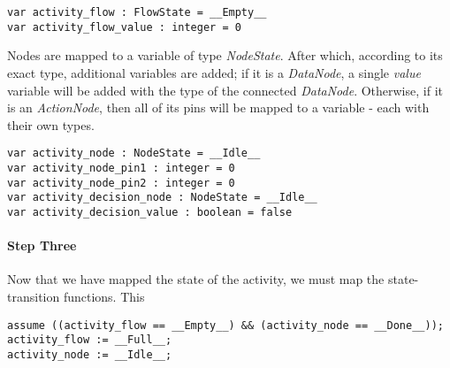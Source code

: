 \begin{lstlisting}[language=xsts]
var activity_flow : FlowState = __Empty__
var activity_flow_value : integer = 0
\end{lstlisting}

Nodes are mapped to a variable of type \emph{NodeState}. After which, according to its exact type, additional variables are added; if it is a \emph{DataNode}, a single \emph{value} variable will be added with the type of the connected \emph{DataNode}. Otherwise, if it is an \emph{ActionNode}, then all of its pins will be mapped to a variable - each with their own types.

\begin{lstlisting}[language=xsts]
var activity_node : NodeState = __Idle__
var activity_node_pin1 : integer = 0
var activity_node_pin2 : integer = 0
var activity_decision_node : NodeState = __Idle__
var activity_decision_value : boolean = false
\end{lstlisting}

\paragraph{Step Three} 

Now that we have mapped the state of the activity, we must map the state-transition functions. This 

\begin{lstlisting}[language=xsts]
assume ((activity_flow == __Empty__) && (activity_node == __Done__));
activity_flow := __Full__;
activity_node := __Idle__;
\end{lstlisting}
